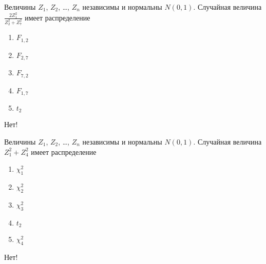\documentclass[t]{beamer}
\begin{document}
 \begin{frame} \label{37-No} 
\begin{block}{37} 

Величины $Z_1$, $Z_2$, \ldots, $Z_n$ независимы и нормальны $N(0,1)$. Случайная величина $\frac{2Z_1^2}{Z_2^2+Z_7^2}$ имеет распределение
 


 \end{block} 
\begin{enumerate} 
\item[] \hyperlink{37-Yes}{\beamergotobutton{} $F_{1,2}$}
\item[] \hyperlink{37-No}{\beamergotobutton{} $F_{2,7}$}
\item[] \hyperlink{37-No}{\beamergotobutton{} $F_{7,2}$}
\item[] \hyperlink{37-No}{\beamergotobutton{} $F_{1,7}$}
\item[] \hyperlink{37-No}{\beamergotobutton{} $t_2$}
\end{enumerate} 

 \alert{Нет!} 
\end{frame} 


 \begin{frame} \label{38-No} 
\begin{block}{38} 

Величины $Z_1$, $Z_2$, \ldots, $Z_n$ независимы и нормальны $N(0,1)$. Случайная величина $Z_1^2+Z_4^2$ имеет распределение
 


 \end{block} 
\begin{enumerate} 
\item[] \hyperlink{38-No}{\beamergotobutton{} $\chi^2_1$}
\item[] \hyperlink{38-Yes}{\beamergotobutton{} $\chi^2_2$}
\item[] \hyperlink{38-No}{\beamergotobutton{} $\chi^2_3$}
\item[] \hyperlink{38-No}{\beamergotobutton{} $t_2$}
\item[] \hyperlink{38-No}{\beamergotobutton{} $\chi^2_4$}
\end{enumerate} 

 \alert{Нет!} 
\end{frame} 
\end{document}
